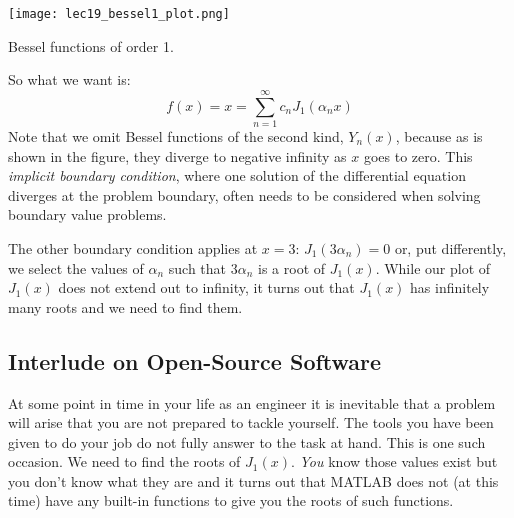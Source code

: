 \vspace{0.25cm}
\begin{marginfigure}
\texttt{[image: lec19\_bessel1\_plot.png]}
\label{fig:lec19-bessel}
\caption{Bessel functions of order 1.}
\end{marginfigure}
\noindent So what we want is:
\begin{equation*}
f(x) = x = \sum\limits_{n=1}^{\infty}c_n J_{1}\left(\alpha_n x\right)
\end{equation*}
Note that we omit Bessel functions of the second kind, $Y_n(x)$, because as is shown in the figure, they diverge to negative infinity as $x$ goes to zero.  This \emph{implicit boundary condition}, where one solution of the differential equation diverges at the problem boundary, often needs to be considered when solving boundary value problems.

The other boundary condition applies at $x=3$: $J_{1}(3\alpha_n) = 0$ or, put differently, we select the values of $\alpha_n$ such that $3\alpha_n$ is a root of $J_{1}(x)$.  While our plot of $J_1(x)$ does not extend out to infinity, it turns out that $J_1(x)$ has infinitely many roots and we need to find them.

\subsection{Interlude on Open-Source Software}
At some point in time in your life as an engineer it is inevitable that a problem will arise that you are not prepared to tackle yourself. The tools you have been given to do your job do not fully answer to the task at hand.  This is one such occasion.  We need to find the roots of $J_1(x)$.  \emph{You} know those values exist but you don't know what they are and it turns out that MATLAB does not (at this time) have any built-in functions to give you the roots of such functions.

